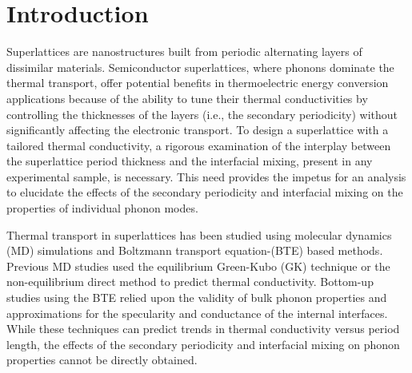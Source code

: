 \documentclass[aps,prb,preprint,preprintnumbers,amsmath,amssymb,floatfix,superscriptaddress]{revtex4}
\begin{document}
\section{Introduction}

Superlattices are nanostructures built from periodic alternating layers of dissimilar materials. Semiconductor superlattices, where phonons dominate the thermal transport, offer potential benefits in thermoelectric energy conversion applications because of the ability to tune their thermal conductivities by controlling the thicknesses of the layers (i.e., the secondary periodicity) without significantly affecting the electronic transport.\cite{broido1995effect,balandin2003mechanism,kim2006thermal} To design a superlattice with a tailored thermal conductivity, a rigorous examination of the interplay between the superlattice period thickness and the interfacial mixing, present in any experimental sample, is necessary. This need provides the impetus for an analysis to elucidate the effects of the secondary periodicity and interfacial mixing on the properties of individual phonon modes. 

Thermal transport in superlattices has been studied using molecular dynamics (MD) simulations and Boltzmann transport equation-(BTE) based methods. Previous MD studies used the equilibrium Green-Kubo (GK) \cite {PhysRevB.85.195302,PhysRevB.77.184302} technique or the non-equilibrium \cite{PhysRevB.77.184302,PhysRevB.79.214307,PhysRevB.72.174302,PhysRevB.79.075316} direct method to predict thermal conductivity. Bottom-up studies using the BTE relied upon the validity of bulk phonon properties\cite{walkauskas:2579,chen:220} and approximations for the specularity and conductance of the internal interfaces.\cite{PhysRevB.57.14958} While these techniques can predict trends in thermal conductivity versus period length, the effects of the secondary periodicity and interfacial mixing on phonon properties cannot be directly obtained.
\end{document}
